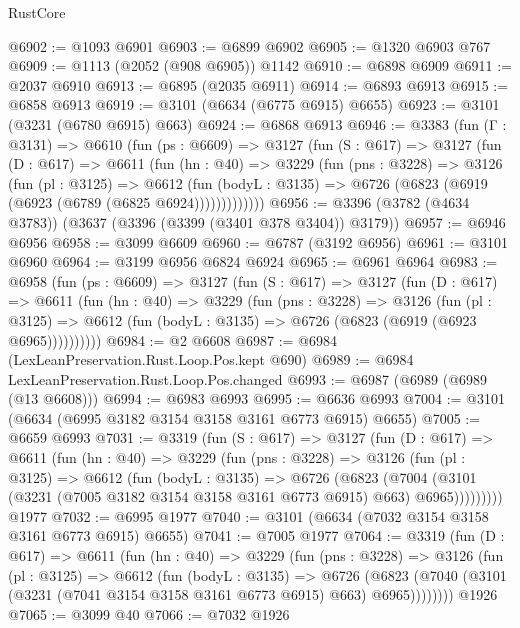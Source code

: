 \begin{lexlean}{RustCore}
\begin{coremodule}
@6902 := @1093 @6901
@6903 := @6899 @6902
@6905 := @1320 @6903 @767
@6909 := @1113 (@2052 (@908 @6905)) @1142
@6910 := @6898 @6909
@6911 := @2037 @6910
@6913 := @6895 (@2035 @6911)
@6914 := @6893 @6913
@6915 := @6858 @6913
@6919 := @3101 (@6634 (@6775 @6915) @6655)
@6923 := @3101 (@3231 (@6780 @6915) @663)
@6924 := @6868 @6913
@6946 := @3383
    (fun (Γ : @3131) =>
    @6610
      (fun (ps : @6609) =>
      @3127
        (fun (S : @617) =>
        @3127
          (fun (D : @617) =>
          @6611
            (fun (hn : @40) =>
            @3229
              (fun (pns : @3228) =>
              @3126
                (fun (pl : @3125) =>
                @6612
                  (fun (bodyL : @3135) =>
                  @6726 (@6823 (@6919 (@6923 (@6789 (@6825 @6924)))))))))))))
@6956 := @3396 (@3782 (@4634 @3783)) (@3637 (@3396 (@3399 (@3401 @378 @3404)) @3179))
@6957 := @6946 @6956
@6958 := @3099 @6609
@6960 := @6787 (@3192 @6956)
@6961 := @3101 @6960
@6964 := @3199 @6956 @6824 @6924
@6965 := @6961 @6964
@6983 := @6958
    (fun (ps : @6609) =>
    @3127
      (fun (S : @617) =>
      @3127
        (fun (D : @617) =>
        @6611
          (fun (hn : @40) =>
          @3229
            (fun (pns : @3228) =>
            @3126
              (fun (pl : @3125) =>
              @6612 (fun (bodyL : @3135) => @6726 (@6823 (@6919 (@6923 @6965))))))))))
@6984 := @2 @6608
@6987 := @6984 (LexLeanPreservation.Rust.Loop.Pos.kept @690)
@6989 := @6984 LexLeanPreservation.Rust.Loop.Pos.changed
@6993 := @6987 (@6989 (@6989 (@13 @6608)))
@6994 := @6983 @6993
@6995 := @6636 @6993
@7004 := @3101 (@6634 (@6995 @3182 @3154 @3158 @3161 @6773 @6915) @6655)
@7005 := @6659 @6993
@7031 := @3319
    (fun (S : @617) =>
    @3127
      (fun (D : @617) =>
      @6611
        (fun (hn : @40) =>
        @3229
          (fun (pns : @3228) =>
          @3126
            (fun (pl : @3125) =>
            @6612
              (fun (bodyL : @3135) =>
              @6726
                (@6823
                  (@7004
                    (@3101 (@3231 (@7005 @3182 @3154 @3158 @3161 @6773 @6915) @663) @6965)))))))))
    @1977
@7032 := @6995 @1977
@7040 := @3101 (@6634 (@7032 @3154 @3158 @3161 @6773 @6915) @6655)
@7041 := @7005 @1977
@7064 := @3319
    (fun (D : @617) =>
    @6611
      (fun (hn : @40) =>
      @3229
        (fun (pns : @3228) =>
        @3126
          (fun (pl : @3125) =>
          @6612
            (fun (bodyL : @3135) =>
            @6726
              (@6823 (@7040 (@3101 (@3231 (@7041 @3154 @3158 @3161 @6773 @6915) @663) @6965))))))))
    @1926
@7065 := @3099 @40
@7066 := @7032 @1926

\end{coremodule}
\end{lexlean}
